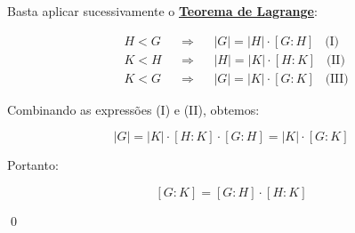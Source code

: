 \documentclass[16pt,openany]{book}
\theoremstyle{definition}
\begin{document}
{\color{red}

Basta aplicar sucessivamente o \hyperlink{lagrange}{\textbf{Teorema de Lagrange}}:

\begin{align*}
& H < G &&\Rightarrow && \lvert G \rvert = \lvert H \rvert \cdot [G : H] \; \; \; \text{(I)} \\
& K < H &&\Rightarrow && \lvert H \rvert = \lvert K \rvert \cdot [H : K] \; \; \; \text{(II)} \\
& K < G &&\Rightarrow && \lvert G \rvert = \lvert K \rvert \cdot [G : K] \; \; \; \text{(III)}
\end{align*}

Combinando as expressões (I) e (II), obtemos:

\[
\lvert G \rvert = \lvert K \rvert \cdot [H : K] \cdot [G : H] = \lvert K \rvert \cdot [G : K]
\]

Portanto:

\[
[G : K] = [G : H] \cdot [H : K]
\]

\qed}
\end{document}
